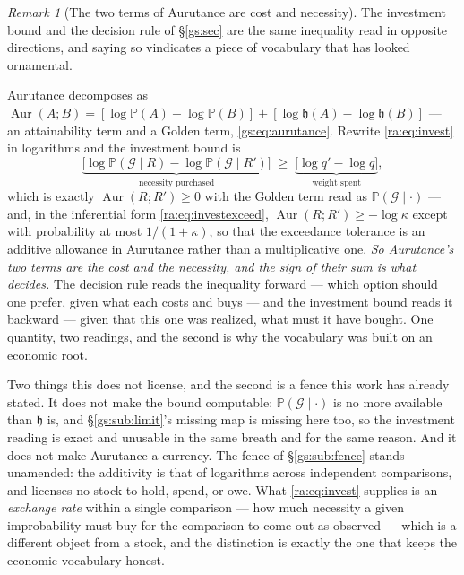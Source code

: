 \documentclass[11pt]{article}
\numberwithin{equation}{section}
\theoremstyle{plain}
\theoremstyle{definition}
\theoremstyle{remark}
\newtheorem{remark}[theorem]{Remark}
\newcommand{\PP}{\mathbb{P}}
\newcommand{\hm}{\mathfrak{h}}
\begin{document}
\begin{remark}[The two terms of Aurutance are cost and necessity]
\label{ra:rem:aurutance}
The investment bound and the decision rule of \S\ref{gs:sec} are the same
inequality read in opposite directions, and saying so vindicates a piece
of vocabulary that has looked ornamental.

Aurutance decomposes as
$\operatorname{Aur}(A;B)=[\log\PP(A)-\log\PP(B)]+[\log\hm(A)-\log\hm(B)]$
--- an attainability term and a Golden term,
\eqref{gs:eq:aurutance}. Rewrite \eqref{ra:eq:invest} in logarithms and
the investment bound is
\[
\underbrace{\bigl[\log\PP(\mathcal G\mid R)-\log\PP(\mathcal G\mid R')\bigr]}
_{\text{necessity purchased}}
\;\ge\;
\underbrace{\bigl[\log q'-\log q\bigr]}_{\text{weight spent}},
\]
which is exactly $\operatorname{Aur}(R;R')\ge0$ with the Golden term read
as $\PP(\mathcal G\mid\cdot)$ --- and, in the inferential form
\eqref{ra:eq:investexceed}, $\operatorname{Aur}(R;R')\ge-\log\kappa$
except with probability at most $1/(1+\kappa)$, so that the exceedance
tolerance is an additive allowance in Aurutance rather than a
multiplicative one. \emph{So Aurutance's two terms are the
cost and the necessity, and the sign of their sum is what decides.} The
decision rule reads the inequality forward --- which option should one
prefer, given what each costs and buys --- and the investment bound reads
it backward --- given that this one was realized, what must it have
bought. One quantity, two readings, and the second is why the vocabulary
was built on an economic root.

Two things this does not license, and the second is a fence this work has
already stated. It does not make the bound computable: $\PP(\mathcal
G\mid\cdot)$ is no more available than $\hm$ is, and
\S\ref{gs:sub:limit}'s missing map is missing here too, so the investment
reading is exact and unusable in the same breath and for the same reason.
And it does not make Aurutance a currency. The fence of
\S\ref{gs:sub:fence} stands unamended: the additivity is that of
logarithms across independent comparisons, and licenses no stock to hold,
spend, or owe. What \eqref{ra:eq:invest} supplies is an
\emph{exchange rate} within a single comparison --- how much necessity a
given improbability must buy for the comparison to come out as observed
--- which is a different object from a stock, and the distinction is
exactly the one that keeps the economic vocabulary honest.
\end{remark}
\end{document}
